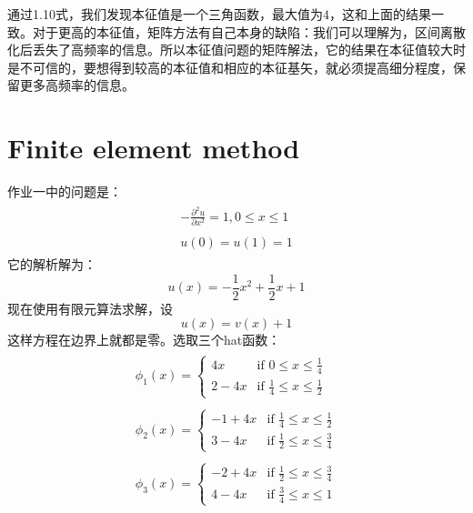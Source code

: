 \documentclass[paper=a4, fontsize=11pt]{scrartcl} %
\numberwithin{equation}{section} %
\numberwithin{figure}{section} %
\numberwithin{table}{section} %
\begin{document}
\begin{CJK*}{UTF8}{gbsn}
通过1.10式，我们发现本征值是一个三角函数，最大值为$4$，这和上面的结果一致。对于更高的本征值，矩阵方法有自己本身的缺陷：我们可以理解为，区间离散化后丢失了高频率的信息。所以本征值问题的矩阵解法，它的结果在本征值较大时是不可信的，要想得到较高的本征值和相应的本征基矢，就必须提高细分程度，保留更多高频率的信息。

\pagebreak
\section{Finite element method}
作业一中的问题是：
\begin{align}
\begin{split}
-\frac{\partial ^2 u}{\partial x^2} = 1, 0\le x \le 1 \\\\
u(0) = u(1) = 1
\end{split}
\end{align}
它的解析解为：
\begin{equation}
u(x) = -\frac{1}{2}x^2 + \frac{1}{2}x+1
\end{equation}
现在使用有限元算法求解，设
\begin{equation}
u(x) = v(x) + 1
\end{equation}
这样方程在边界上就都是零。选取三个hat函数：
\begin{align}
\begin{split}
\phi_1(x) = \left \{ \begin{array}{ll} 
	4x & \mbox{if } 0 \le x \le \frac{1}{4} \\
	2-4x & \mbox{if } \frac{1}{4} \le x \le \frac{1}{2}
	\end{array}
\right. \\\\
\phi_2(x) = \left \{ \begin{array}{ll} 
	-1 + 4x & \mbox{if } \frac{1}{4} \le x \le \frac{1}{2} \\
	3-4x & \mbox{if } \frac{1}{2} \le x \le \frac{3}{4}
	\end{array}
\right. \\\\
\phi_3(x) = \left \{ \begin{array}{ll} 
	-2 + 4x & \mbox{if } \frac{1}{2} \le x \le \frac{3}{4} \\
	4-4x & \mbox{if } \frac{3}{4} \le x \le 1
	\end{array}
\right.
\end{split}
\end{align}


\end{CJK*}
\end{document}
